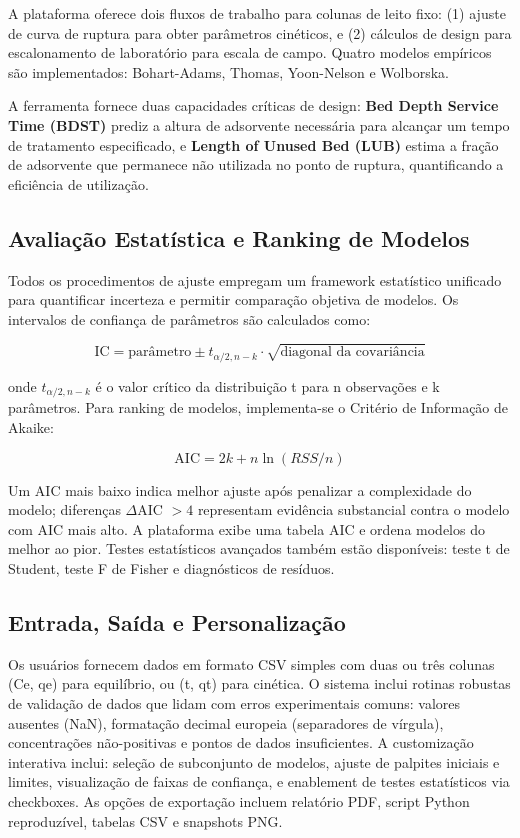 \documentclass[openany, a4paper, twoside]{article}
\begin{document}
A plataforma oferece dois fluxos de trabalho para colunas de leito fixo: (1) ajuste de curva de ruptura para obter parâmetros cinéticos, e (2) cálculos de design para escalonamento de laboratório para escala de campo. Quatro modelos empíricos são implementados: Bohart-Adams, Thomas, Yoon-Nelson e Wolborska.

A ferramenta fornece duas capacidades críticas de design: \textbf{Bed Depth Service Time (BDST)} prediz a altura de adsorvente necessária para alcançar um tempo de tratamento especificado, e \textbf{Length of Unused Bed (LUB)} estima a fração de adsorvente que permanece não utilizada no ponto de ruptura, quantificando a eficiência de utilização.

\subsection{Avaliação Estatística e Ranking de Modelos}

Todos os procedimentos de ajuste empregam um framework estatístico unificado para quantificar incerteza e permitir comparação objetiva de modelos. Os intervalos de confiança de parâmetros são calculados como:

\begin{equation}
\text{IC} = \text{parâmetro} \pm t_{\alpha/2, n-k} \cdot \sqrt{\text{diagonal da covariância}}
\label{eq:ci}
\end{equation}

onde $t_{\alpha/2, n-k}$ é o valor crítico da distribuição t para n observações e k parâmetros. Para ranking de modelos, implementa-se o Critério de Informação de Akaike:

\begin{equation}
\text{AIC} = 2k + n \ln(RSS/n)
\label{eq:aic}
\end{equation}

Um AIC mais baixo indica melhor ajuste após penalizar a complexidade do modelo; diferenças $\Delta$AIC $> 4$ representam evidência substancial contra o modelo com AIC mais alto. A plataforma exibe uma tabela AIC e ordena modelos do melhor ao pior. Testes estatísticos avançados também estão disponíveis: teste t de Student, teste F de Fisher e diagnósticos de resíduos.

\subsection{Entrada, Saída e Personalização}

Os usuários fornecem dados em formato CSV simples com duas ou três colunas (Ce, qe) para equilíbrio, ou (t, qt) para cinética. O sistema inclui rotinas robustas de validação de dados que lidam com erros experimentais comuns: valores ausentes (NaN), formatação decimal europeia (separadores de vírgula), concentrações não-positivas e pontos de dados insuficientes. A customização interativa inclui: seleção de subconjunto de modelos, ajuste de palpites iniciais e limites, visualização de faixas de confiança, e enablement de testes estatísticos via checkboxes. As opções de exportação incluem relatório PDF, script Python reproduzível, tabelas CSV e snapshots PNG.
\end{document}
